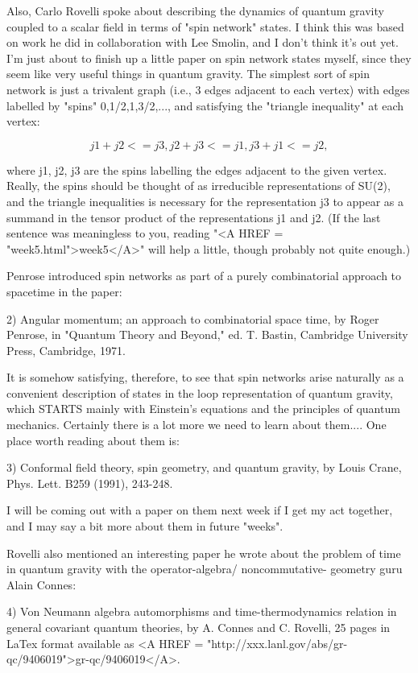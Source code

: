 Also, Carlo Rovelli spoke about describing the dynamics of quantum
gravity coupled to a scalar field in terms of "spin network" states.  I think
this was based on work he did in collaboration with Lee Smolin, and I
don't think it's out yet.  I'm just about to finish up a little paper on
spin network states myself, since they seem like very useful things in
quantum gravity.  The simplest sort of spin network is just a
trivalent graph (i.e., 3 edges adjacent to each vertex) with edges
labelled by "spins" 0,1/2,1,3/2,..., and satisfying the "triangle
inequality" at each vertex:

$$
         j1 + j2 <= j3,      j2 + j3 <= j1,      j3 + j1 <= j2,
$$
    

where j1, j2, j3 are the spins labelling the edges adjacent to the given
vertex.  Really, the spins should be thought of as irreducible
representations of SU(2), and the triangle inequalities is necessary
for the representation j3 to appear as a summand in the tensor
product of the representations j1 and j2.  (If the last sentence was
meaningless to you, reading "<A HREF = "week5.html">week5</A>" will help a little, though probably
not quite enough.)  

Penrose introduced spin networks as part of a purely combinatorial
approach to spacetime in the paper:

2) Angular momentum; an approach to combinatorial space
time, by Roger Penrose, in "Quantum Theory and Beyond," ed. T. Bastin,
Cambridge University Press, Cambridge, 1971.

It is somehow satisfying, therefore, to see that spin networks arise
naturally as a convenient description of states in the loop
representation of quantum gravity, which STARTS mainly with Einstein's
equations and the principles of quantum mechanics.  Certainly there is a
lot more we need to learn about them.... One place worth reading about
them is:

3) Conformal field theory, spin geometry, and quantum gravity, by Louis
Crane, Phys. Lett. B259 (1991), 243-248.

I will be coming out with a paper on them next week if I get my act
together, and I may say a bit more about them in future "weeks".  

Rovelli also mentioned an interesting paper he wrote about the problem of
time in quantum gravity with the operator-algebra/ noncommutative-
geometry guru Alain Connes:

4) Von Neumann algebra automorphisms and time-thermodynamics relation in
general covariant quantum theories, by A. Connes and C. Rovelli, 25
pages in LaTex format available as <A HREF = "http://xxx.lanl.gov/abs/gr-qc/9406019">gr-qc/9406019</A>.  

